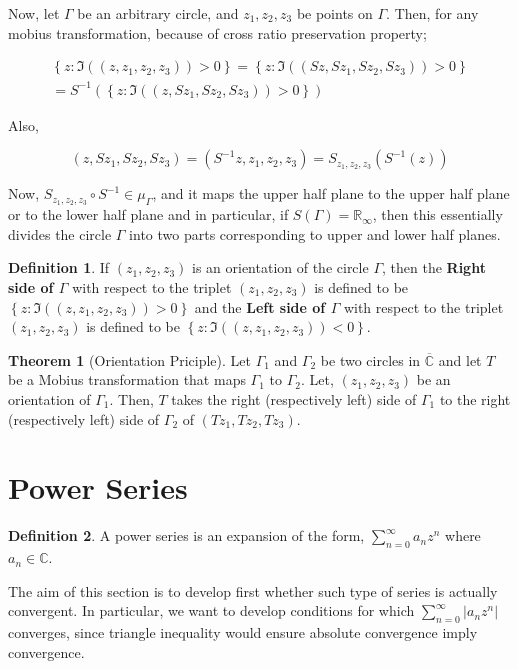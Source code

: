 \documentclass[12pt]{article}
\newcommand{\Rinf}{\mathbb{R}_{\infty}}
\newcommand{\C}{\mathbb{C}}
\newcommand{\Cinf}{\overline{\C}}
\let\oldsection\section
\renewcommand\section{\clearpage\oldsection}
\theoremstyle{definition}
\newtheorem{thm}{Theorem}
\newtheorem{defn}{Definition}
\newenvironment{definition}{
\begin{tcolorbox}[colback=green!5!white,colframe=green!75!black, parbox = false]\begin{defn} }{\end{defn}\end{tcolorbox} }
\newenvironment{theorem}{
\begin{tcolorbox}[colback=green!5!white,colframe=green!75!black, parbox = false]\begin{thm} }{\end{thm}\end{tcolorbox} }
\begin{document}
Now, let $\Gamma$ be an arbitrary circle, and $z_1, z_2, z_3$ be points on $\Gamma$. Then, for any mobius transformation, because of cross ratio preservation property;

\begin{multline*}
    \left\{ z: \Im((z, z_1, z_2, z_3))  > 0\right\} = \left\{ z: \Im((Sz, Sz_1, Sz_2, Sz_3))  > 0\right\} \\
    = S^{-1}\left( \left\{ z: \Im((z, Sz_1, Sz_2, Sz_3))  > 0\right\} \right)
\end{multline*}

Also,

$$(z, Sz_1, Sz_2, Sz_3) = \left(S^{-1}z, z_1, z_2, z_3\right) = S_{z_1, z_2, z_3}(S^{-1}(z))$$

Now, $S_{z_1, z_2, z_3}\circ S^{-1} \in \mu_\Gamma$, and it maps the upper half plane to the upper half plane or to the lower half plane and in particular, if $S(\Gamma) = \Rinf$, then this essentially divides the circle $\Gamma$ into two parts corresponding to upper and lower half planes. 

\begin{definition}
    If $(z_1, z_2, z_3)$ is an orientation of the circle $\Gamma$, then the \textbf{Right side of $\Gamma$} with respect to the triplet $(z_1, z_2, z_3)$ is defined to be $\left\{ z: \Im((z, z_1, z_2, z_3)) > 0 \right\}$ and the \textbf{Left side of $\Gamma$} with respect to the triplet $(z_1, z_2, z_3)$ is defined to be $\left\{ z: \Im((z, z_1, z_2, z_3)) < 0 \right\}$.
\end{definition}


\begin{theorem}[Orientation Priciple]
    Let $\Gamma_1$ and $\Gamma_2$ be two circles in $\Cinf$ and let $T$ be a Mobius transformation that maps $\Gamma_1$ to $\Gamma_2$. Let, $(z_1, z_2, z_3)$ be an orientation of $\Gamma_1$. Then, $T$ takes the right (respectively left) side of $\Gamma_1$ to the right (respectively left) side of $\Gamma_2$ of $(Tz_1, Tz_2, Tz_3)$. 
\end{theorem}


\section{Power Series}
\begin{definition}
    A power series is an expansion of the form, $\sum_{n=0}^{\infty} a_nz^n$ where $a_n \in \C$.
\end{definition}

The aim of this section is to develop first whether such type of series is actually convergent. In particular, we want to develop conditions for which $\sum_{n=0}^{\infty} \vert a_nz^n \vert$ converges, since triangle inequality would ensure absolute convergence imply convergence.
\end{document}
